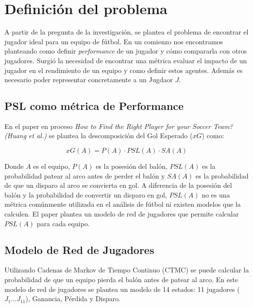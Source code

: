 \documentclass[
  a4paper,
]{article}
\begin{document}
\newpage

\hypertarget{definiciuxf3n-del-problema}{%
\section{\texorpdfstring{\textbf{Definición del
problema}}{Definición del problema}}\label{definiciuxf3n-del-problema}}

A partir de la pregunta de la investigación, se plantea el problema de
encontrar el jugador ideal para un equipo de fútbol. En un comienzo nos
encontramos planteando como definir \emph{performance} de un jugador y
cómo compararla con otros jugadores. Surgió la necesidad de encontrar
una métrica evaluar el impacto de un jugador en el rendimiento de un
equipo y como definir estos agentes. Además es necesario poder
representar concretamente a un Jugdaor \(J\).

\hypertarget{psl-como-muxe9trica-de-performance}{%
\subsection{PSL como métrica de
Performance}\label{psl-como-muxe9trica-de-performance}}

En el paper en proceso \emph{How to Find the Right Player for your
Soccer Team? (Huang et al.)} se plantea la descomposición del Gol
Esperado (\(xG\)) como:

\[
    xG(A) = P(A) \cdot PSL(A) \cdot SA(A)
\]

Donde \(A\) es el equipo, \(P(A)\) es la posesión del balón, \(PSL(A)\)
es la probabilidad patear al arco antes de perder el balón y \(SA(A)\)
es la probabilidad de que un disparo al arco se convierta en gol. A
diferencia de la posesión del balón y la probabilidad de convertir un
disparo en gol, \(PSL(A)\) no es una métrica comúnmente utilizada en el
análisis de fútbol ni existen modelos que la calculen. El paper plantea
un modelo de red de jugadores que permite calcular \(PSL(A)\) para cada
equipo.

\hypertarget{modelo-de-red-de-jugadores}{%
\subsection{Modelo de Red de
Jugadores}\label{modelo-de-red-de-jugadores}}

Utilizando Cadenas de Markov de Tiempo Continuo (CTMC) se puede calcular
la probabilidad de que un equipo pierda el balón antes de patear al
arco. En este modelo de red de jugadores se plantea un modelo de 14
estados: 11 jugadores (\(J_{1} \dots J_{11}\)), Ganancia, Pérdida y
Disparo.
\end{document}
